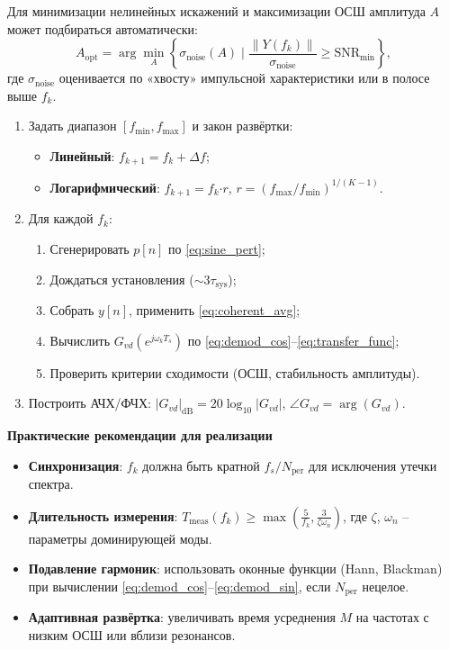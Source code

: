 Для минимизации нелинейных искажений и максимизации ОСШ амплитуда $A$ может подбираться автоматически:
\begin{equation}
    A_{\text{opt}} = \arg\min_{A} \left\{ \sigma_{\text{noise}}(A) \; \big| \; 
    \frac{\|Y(f_k)\|}{\sigma_{\text{noise}}} \geq \text{SNR}_{\min} \right\},
    \label{eq:adaptive_amp}
\end{equation}
где $\sigma_{\text{noise}}$ оценивается по «хвосту» импульсной характеристики или в полосе выше $f_k$.

\begin{enumerate}
    \item Задать диапазон $[f_{\min}, f_{\max}]$ и закон развёртки:
    \begin{itemize}
        \item \textbf{Линейный}: $f_{k+1} = f_k + \Delta f$;
        \item \textbf{Логарифмический}: $f_{k+1} = f_k \mathord{\cdot} r$, $r = (f_{\max}/f_{\min})^{1/(K-1)}$.
    \end{itemize}
    \item Для каждой $f_k$:
    \begin{enumerate}
        \item Сгенерировать $p[n]$ по \eqref{eq:sine_pert};
        \item Дождаться установления ($\sim 3\tau_{\text{sys}}$);
        \item Собрать $y[n]$, применить \eqref{eq:coherent_avg};
        \item Вычислить $G_{vd}(e^{j\omega_k T_s})$ по \eqref{eq:demod_cos}--\eqref{eq:transfer_func};
        \item Проверить критерии сходимости (ОСШ, стабильность амплитуды).
    \end{enumerate}
    \item Построить АЧХ/ФЧХ: $|G_{vd}|_{\text{dB}} = 20\log_{10}|G_{vd}|$, $\angle G_{vd} = \arg(G_{vd})$.
\end{enumerate}

\textbf{Практические рекомендации для реализации}
\begin{itemize}
    \item \textbf{Синхронизация}: $f_k$ должна быть кратной $f_s/N_{\text{per}}$ для исключения утечки спектра.
    \item \textbf{Длительность измерения}: $T_{\text{meas}}(f_k) \geq \max\left( \frac{5}{f_k}, \frac{3}{\zeta \omega_n} \right)$, где $\zeta$, $\omega_n$ -- параметры доминирующей моды.
    \item \textbf{Подавление гармоник}: использовать оконные функции (Hann, Blackman) при вычислении \eqref{eq:demod_cos}--\eqref{eq:demod_sin}, если $N_{\text{per}}$ нецелое.
    \item \textbf{Адаптивная развёртка}: увеличивать время усреднения $M$ на частотах с низким ОСШ или вблизи резонансов.
\end{itemize}

